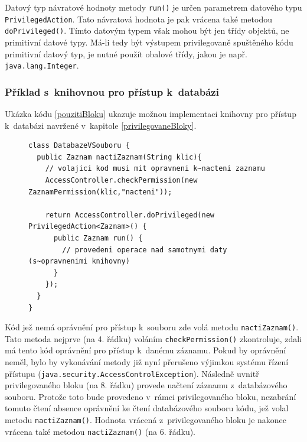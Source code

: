 Datový typ návratové hodnoty metody {\tt run()} je určen parametrem datového typu {\tt PrivilegedAction}.
Tato návratová hodnota je pak vrácena také metodou {\tt doPrivileged()}.
Tímto datovým typem však mohou být jen třídy objektů, ne primitivní datové typy.
Má-li tedy být výstupem privilegovaně spuštěného kódu primitivní datový typ, je nutné použít obalové třídy, jakou je např. {\tt java.lang.Integer}.

\subsubsection{Příklad s~knihovnou pro přístup k~databázi}\label{databazeVsouboru}

Ukázka kódu \ref{pouzitiBloku} ukazuje možnou implementaci knihovny pro přístup k~databázi navržené v~kapitole \ref{privilegovaneBloky}.

\begin{figure}[tbh]
\begin{lstlisting}[caption=Demonstrační knihovna pro přístup k~databázi, label=pouzitiBloku]
class DatabazeVSouboru {
  public Zaznam nactiZaznam(String klic){
    // volajici kod musi mit opravneni k~nacteni zaznamu
    AccessController.checkPermission(new ZaznamPermission(klic,"nacteni"));
    
    return AccessController.doPrivileged(new PrivilegedAction<Zaznam>() {
      public Zaznam run() {
        // provedeni operace nad samotnymi daty (s~opravnenimi knihovny)
      }
    });
  }
}
\end{lstlisting}
\end{figure}

Kód jež nemá oprávnění pro přístup k~souboru zde volá metodu {\tt nactiZaznam()}.
Tato metoda nejprve (na 4. řádku) voláním {\tt checkPermission()} zkontroluje, zdali má tento kód oprávnění pro přístup k~danému záznamu.
Pokud by oprávnění neměl, bylo by vykonávání metody již nyní přerušeno výjimkou systému řízení přístupu ({\tt java.security.AccessControlException}).
Následně uvnitř privilegovaného bloku (na 8. řádku) provede načtení záznamu z~databázového souboru.
Protože toto bude provedeno v~rámci privilegovaného bloku, nezabrání tomuto čtení absence oprávnění ke čtení databázového souboru kódu, jež volal metodu {\tt nactiZaznam()}.
Hodnota vrácená z~privilegovaného bloku je nakonec vrácena také metodou {\tt nactiZaznam()} (na 6. řádku).

